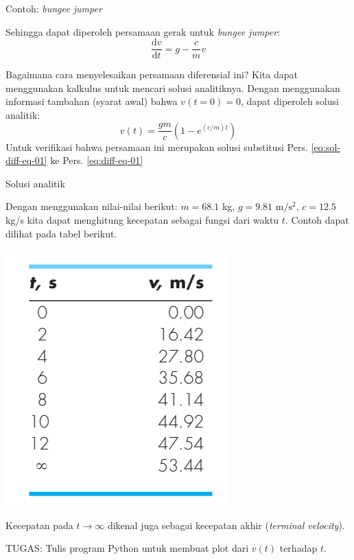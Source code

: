 \begin{frame}{Contoh: \emph{bungee jumper}}

Sehingga dapat diperoleh persamaan gerak untuk \emph{bungee jumper}:
\begin{equation}
\frac{\mathrm{d}v}{\mathrm{d}t} = g - \frac{c}{m}v
\label{eq:diff-eq-01}
\end{equation}

Bagaimana cara menyelesaikan persamaan diferensial ini? Kita dapat
menggunakan kalkulus untuk mencari solusi analitiknya. Dengan
menggunakan informasi tambahan (syarat awal) bahwa $v(t=0)=0$, dapat
diperoleh solusi analitik:
\begin{equation}
v(t) = \frac{gm}{c}\left( 1 - e^{(c/m)t} \right)
\label{eq:sol-diff-eq-01}
\end{equation}
Untuk verifikasi bahwa
persamaan ini merupakan solusi substitusi
Pers. \eqref{eq:sol-diff-eq-01} ke Pers. \eqref{eq:diff-eq-01}
\end{frame}



\begin{frame}{Solusi analitik}

\fontsize{9pt}{10pt}\selectfont

Dengan menggunakan nilai-nilai berikut: $m = 68.1$ kg, $g = 9.81$
$\mathrm{m}/\mathrm{s}^2$, $c = 12.5$ kg/s
kita dapat menghitung kecepatan sebagai fungsi dari waktu $t$.
Contoh dapat dilihat pada tabel berikut.

{\centering
\includegraphics[height=0.5\textheight]{../chapra_7th/Chapra_Example_1_1_table.png}
\par}

Kecepatan pada $t \rightarrow \infty$ dikenal juga sebagai kecepatan akhir
(\emph{terminal velocity}).

TUGAS: Tulis program Python untuk membuat plot dari $v(t)$ terhadap $t$.

\end{frame}



